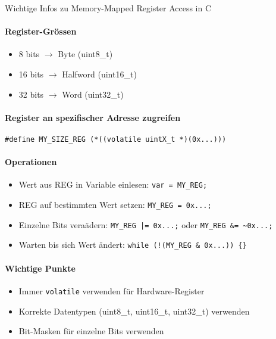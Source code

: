 \begin{concept}{Wichtige Infos zu Memory-Mapped Register Access in C}

\paragraph{Register-Grössen}
    \begin{itemize}
        \item 8 bits $\rightarrow$ Byte (uint8\_t)
        \item 16 bits $\rightarrow$ Halfword (uint16\_t)
        \item 32 bits $\rightarrow$ Word (uint32\_t)
    \end{itemize}

    \paragraph{Register an spezifischer Adresse zugreifen}
\begin{lstlisting}[style=basesmol]
#define MY_SIZE_REG (*((volatile uintX_t *)(0x...)))
\end{lstlisting}


    \paragraph{Operationen}
    \begin{itemize}
        \item Wert aus REG in Variable einlesen: \texttt{var = MY\_REG;}
        \item REG auf bestimmten Wert setzen: \texttt{MY\_REG = 0x...;}
        \item Einzelne Bits veraädern: \texttt{MY\_REG |= 0x...;} oder \texttt{MY\_REG \&= \~{}0x...;}
        \item Warten bis sich Wert ändert: \texttt{while (!(MY\_REG \& 0x...)) \{\}}
    \end{itemize}

\paragraph{Wichtige Punkte}
    \begin{itemize}
        \item Immer \texttt{volatile} verwenden für Hardware-Register
        \item Korrekte Datentypen (uint8\_t, uint16\_t, uint32\_t) verwenden
        \item Bit-Masken für einzelne Bits verwenden
    \end{itemize}
\end{concept}

